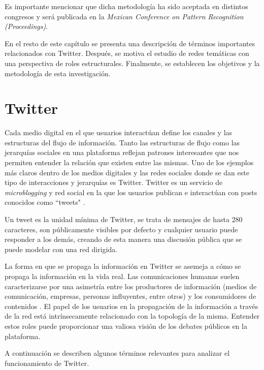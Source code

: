 Es importante mencionar que dicha metodología ha sido aceptada en distintos congresos y será publicada en la \textit{Mexican Conference on Pattern Recognition (Proceedings)}.

En el resto de este capítulo se presenta una descripción de términos importantes relacionados con Twitter. Después, se motiva el estudio de redes temáticas con una perspectiva de roles estructurales. Finalmente, se establecen los objetivos y la metodología de esta investigación. 

\section{Twitter} 

Cada medio digital en el que usuarios interactúan define los canales y las estructuras del flujo de información. Tanto las estructuras de flujo como las jerarquías sociales en una plataforma reflejan patrones interesantes que nos permiten entender la relación que existen entre las mismas. Uno de los ejemplos más claros dentro de los medios digitales y las redes sociales donde se dan este tipo de interacciones y jerarquías es Twitter. Twitter es un servicio de \textit{microblogging} y red social en la que los usuarios publican e interactúan con posts conocidos como “tweets" \cite{twitter_twittercom_nodate}. 

Un tweet es la unidad mínima de Twitter, se trata de mensajes de hasta 280 caracteres, son públicamente visibles por defecto y cualquier usuario puede responder a los demás, creando de esta manera una discusión pública que se puede modelar con una red dirigida.

La forma en que se propaga la información en Twitter se asemeja a cómo se propaga la información en la vida real. Las comunicaciones humanas suelen caracterizarse por una asimetría entre los productores de información (medios de comunicación, empresas, personas influyentes, entre otros) y los consumidores de contenidos \cite{gabielkov_studying_2014}. El papel de los usuarios en la propagación de la información a través de la red está intrínsecamente relacionado con la topología de la misma. Entender estos roles puede proporcionar una valiosa visión de los debates públicos en la plataforma. 

A continuación se describen algunos términos relevantes para analizar el funcionamiento de Twitter. 


